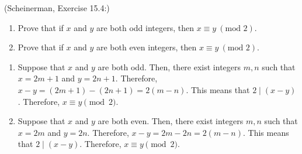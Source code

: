 \documentclass{article}
\newcommand{\modulo}{\text{mod }}
\theoremstyle{definition}
\begin{document}
\begin{question}
    (Scheinerman, Exercise 15.4:)
    \begin{enumerate}
        \item Prove that if $x$ and $y$ are both odd integers, then $x \equiv y \ (\modulo 2)$.
        \item Prove that if $x$ and $y$ are both even integers, then $x \equiv y \ (\modulo 2)$.
    \end{enumerate}
\end{question}
\begin{solution}
    \begin{enumerate}
    \item Suppose that $x$ and $y$ are both odd.  Then, there exist integers $m, n$ such that $x = 2m + 1$ and $y = 2n +1$.  Therefore, $x-y = (2m + 1) - (2n+1) = 2(m-n)$.  This means that $2\mid(x-y)$.  Therefore, $x \equiv y \pmod{2}$.
    \item Suppose that $x$ and $y$ are both even.  Then, there exist integers $m, n$ such that $x = 2m$ and $y = 2n$.  Therefore, $x-y = 2m - 2n = 2(m-n)$.  This means that $2\mid(x-y)$.  Therefore, $x \equiv y \pmod{2}$.
    \end{enumerate}
\end{solution}
\end{document}
